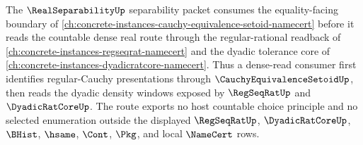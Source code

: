 The $\RealSeparabilityUp$ separability packet consumes the equality-facing boundary of \autoref{ch:concrete-instances-cauchy-equivalence-setoid-namecert} before it reads the countable dense real route through the regular-rational readback of \autoref{ch:concrete-instances-regseqrat-namecert} and the dyadic tolerance core of \autoref{ch:concrete-instances-dyadicratcore-namecert}. Thus a dense-read consumer first identifies regular-Cauchy presentations through $\CauchyEquivalenceSetoidUp$, then reads the dyadic density windows exposed by $\RegSeqRatUp$ and $\DyadicRatCoreUp$. The route exports no host countable choice principle and no selected enumeration outside the displayed $\RegSeqRatUp$, $\DyadicRatCoreUp$, $\BHist$, $\hsame$, $\Cont$, $\Pkg$, and local $\NameCert$ rows.
